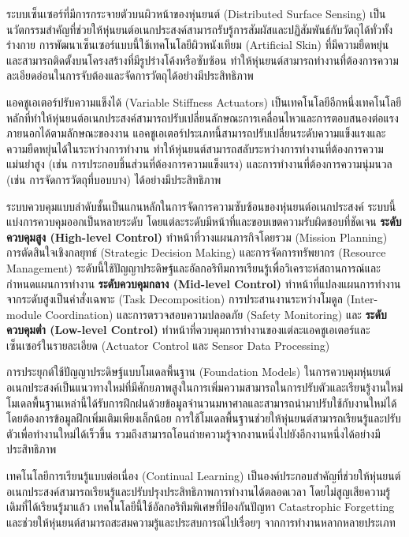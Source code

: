 \documentclass[a4paper]{article}
\begin{document}
ระบบเซ็นเซอร์ที่มีการกระจายตัวบนผิวหน้าของหุ่นยนต์ (Distributed Surface Sensing) เป็นนวัตกรรมสำคัญที่ช่วยให้หุ่นยนต์อเนกประสงค์สามารถรับรู้การสัมผัสและปฏิสัมพันธ์กับวัตถุได้ทั่วทั้งร่างกาย การพัฒนาเซ็นเซอร์แบบนี้ใช้เทคโนโลยีผิวหนังเทียม (Artificial Skin) ที่มีความยืดหยุ่นและสามารถติดตั้งบนโครงสร้างที่มีรูปร่างโค้งหรือซับซ้อน ทำให้หุ่นยนต์สามารถทำงานที่ต้องการความละเอียดอ่อนในการจับต้องและจัดการวัตถุได้อย่างมีประสิทธิภาพ

แอคชูเอเตอร์ปรับความแข็งได้ (Variable Stiffness Actuators) เป็นเทคโนโลยีอีกหนึ่งเทคโนโลยีหลักที่ทำให้หุ่นยนต์อเนกประสงค์สามารถปรับเปลี่ยนลักษณะการเคลื่อนไหวและการตอบสนองต่อแรงภายนอกได้ตามลักษณะของงาน \parencite{ieee2024compact} แอคชูเอเตอร์ประเภทนี้สามารถปรับเปลี่ยนระดับความแข็งแรงและความยืดหยุ่นได้ในระหว่างการทำงาน ทำให้หุ่นยนต์สามารถสลับระหว่างการทำงานที่ต้องการความแม่นยำสูง (เช่น การประกอบชิ้นส่วนที่ต้องการความแข็งแรง) และการทำงานที่ต้องการความนุ่มนวล (เช่น การจัดการวัตถุที่บอบบาง) ได้อย่างมีประสิทธิภาพ

ระบบควบคุมแบบลำดับชั้นเป็นแกนหลักในการจัดการความซับซ้อนของหุ่นยนต์อเนกประสงค์ ระบบนี้แบ่งการควบคุมออกเป็นหลายระดับ โดยแต่ละระดับมีหน้าที่และขอบเขตความรับผิดชอบที่ชัดเจน \textbf{ระดับควบคุมสูง (High-level Control)} ทำหน้าที่วางแผนภารกิจโดยรวม (Mission Planning) การตัดสินใจเชิงกลยุทธ์ (Strategic Decision Making) และการจัดการทรัพยากร (Resource Management) ระดับนี้ใช้ปัญญาประดิษฐ์และอัลกอริทึมการเรียนรู้เพื่อวิเคราะห์สถานการณ์และกำหนดแผนการทำงาน \textbf{ระดับควบคุมกลาง (Mid-level Control)} ทำหน้าที่แปลงแผนการทำงานจากระดับสูงเป็นคำสั่งเฉพาะ (Task Decomposition) การประสานงานระหว่างโมดูล (Inter-module Coordination) และการตรวจสอบความปลอดภัย (Safety Monitoring) และ \textbf{ระดับควบคุมต่ำ (Low-level Control)} ทำหน้าที่ควบคุมการทำงานของแต่ละแอคชูเอเตอร์และเซ็นเซอร์ในรายละเอียด (Actuator Control และ Sensor Data Processing) \parencite{tassi2024multimodal}

การประยุกต์ใช้ปัญญาประดิษฐ์แบบโมเดลพื้นฐาน (Foundation Models) ในการควบคุมหุ่นยนต์อเนกประสงค์เป็นแนวทางใหม่ที่มีศักยภาพสูงในการเพิ่มความสามารถในการปรับตัวและเรียนรู้งานใหม่ โมเดลพื้นฐานเหล่านี้ได้รับการฝึกฝนด้วยข้อมูลจำนวนมหาศาลและสามารถนำมาปรับใช้กับงานใหม่ได้โดยต้องการข้อมูลฝึกเพิ่มเติมเพียงเล็กน้อย การใช้โมเดลพื้นฐานช่วยให้หุ่นยนต์สามารถเรียนรู้และปรับตัวเพื่อทำงานใหม่ได้เร็วขึ้น รวมถึงสามารถโอนถ่ายความรู้จากงานหนึ่งไปยังอีกงานหนึ่งได้อย่างมีประสิทธิภาพ

เทคโนโลยีการเรียนรู้แบบต่อเนื่อง (Continual Learning) เป็นองค์ประกอบสำคัญที่ช่วยให้หุ่นยนต์อเนกประสงค์สามารถเรียนรู้และปรับปรุงประสิทธิภาพการทำงานได้ตลอดเวลา โดยไม่สูญเสียความรู้เดิมที่ได้เรียนรู้มาแล้ว เทคโนโลยีนี้ใช้อัลกอริทึมพิเศษที่ป้องกันปัญหา Catastrophic Forgetting และช่วยให้หุ่นยนต์สามารถสะสมความรู้และประสบการณ์ไปเรื่อยๆ จากการทำงานหลากหลายประเภท
\end{document}
